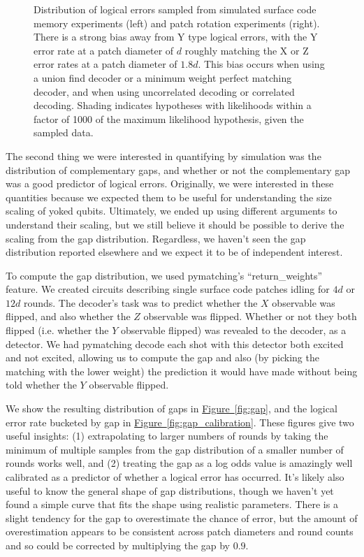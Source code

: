 \documentclass[onecolumn,unpublished,a4paper]{quantumarticle}
\theoremstyle{definition}
\theoremstyle{definition}
\theoremstyle{definition}
\newcommand{\fig}[1]{\hyperref[fig:#1]{Figure~\ref*{fig:#1}}}
\begin{document}
\begin{figure}[h]
{    }
    \caption{
        Distribution of logical errors sampled from simulated surface code memory experiments (left) and patch rotation experiments (right).
        There is a strong bias away from Y type logical errors, with the Y error rate at a patch diameter of $d$ roughly matching the X or Z error rates at a patch diameter of $1.8d$.
        This bias occurs when using a union find decoder or a minimum weight perfect matching decoder, and when using uncorrelated decoding or correlated decoding.
        Shading indicates hypotheses with likelihoods within a factor of 1000 of the maximum likelihood hypothesis, given the sampled data.
    }
    \label{fig:bias}
\end{figure}

The second thing we were interested in quantifying by simulation was the distribution of complementary gaps, and whether or not the complementary gap was a good predictor of logical errors.
Originally, we were interested in these quantities because we expected them to be useful for understanding the size scaling of yoked qubits.
Ultimately, we ended up using different arguments to understand their scaling, but we still believe it should be possible to derive the scaling from the gap distribution.
Regardless, we haven't seen the gap distribution reported elsewhere and we expect it to be of independent interest.

To compute the gap distribution, we used pymatching's ``return\_weights'' feature.
We created circuits describing single surface code patches idling for $4d$ or $12d$ rounds.
The decoder's task was to predict whether the $X$ observable was flipped, and also whether the $Z$ observable was flipped.
Whether or not they both flipped (i.e. whether the $Y$ observable flipped) was revealed to the decoder, as a detector.
We had pymatching decode each shot with this detector both excited and not excited, allowing us to compute the gap and also (by picking the matching with the lower weight) the prediction it would have made without being told whether the $Y$ observable flipped.

We show the resulting distribution of gaps in \fig{gap}, and the logical error rate bucketed by gap in \fig{gap_calibration}.
These figures give two useful insights:
(1) extrapolating to larger numbers of rounds by taking the minimum of multiple samples from the gap distribution of a smaller number of rounds works well,
and (2) treating the gap as a log odds value is amazingly well calibrated as a predictor of whether a logical error has occurred.
It's likely also useful to know the general shape of gap distributions, though we haven't yet found a simple curve that fits the shape using realistic parameters.
There is a slight tendency for the gap to overestimate the chance of error, but the amount of overestimation appears to be consistent across patch diameters and round counts and so could be corrected by multiplying the gap by $0.9$.
\end{document}
